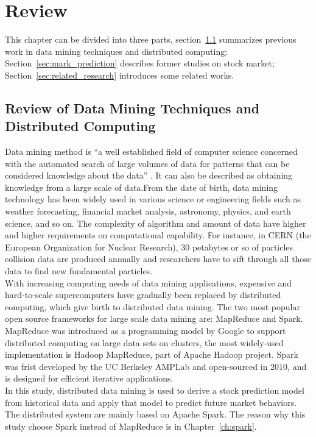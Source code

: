 \chapter{Review}
\label{ch:review}

This chapter can be divided into three parts, section~\ref{sec:dm_dc} summarizes previous work in data mining techniques and distributed computing; Section~\ref{sec:mark_prediction} describes former studies on stock market; Section~\ref{sec:related_research} introduces some related works.

\section{Review of Data Mining Techniques and Distributed Computing}
\label{sec:dm_dc}
Data mining method is ``a well established field of computer science concerned with the automated search of large volumes of data for patterns that can be considered knowledge about the data'' \cite{dubitzky2008data}. It can also be described as obtaining knowledge from a large scale of data.From the date of birth, data mining technology has been widely used in various science or engineering fields such as weather forecasting, financial market analysis, astronomy, physics, and earth science, and so on. The complexity of algorithm and amount of data have higher and higher requirements on computational capability. For instance, in CERN (the European Organization for Nuclear Research), 30 petabytes or so of particles collision data are produced annually and researchers have to sift through all those data to find new fundamental particles.\cite{O'Luanaigh:1997391}\\ 


With increasing computing needs of data mining applications, expensive and hard-to-scale supercomputers have gradually been replaced by distributed computing, which give birth to distributed data mining. The two most popular open source frameworks for large scale data mining are: MapReduce and Spark. MapReduce was introduced as a programming model by Google to support distributed computing on large data sets on clusters, the most widely-used implementation is Hadoop MapReduce, part of Apache Hadoop project\cite[Chapter~3]{sammer2012hadoop}. Spark was frist developed by the UC Berkeley AMPLab and open-sourced in 2010, and is designed for efficient iterative applications\cite{meng2016mllib}.\\

In this study, distributed data mining is used to derive a stock prediction model from historical data and apply that model to predict future market behaviors. The distributed system are mainly based on Apache Spark. The reason why this study choose Spark instead of MapReduce is in Chapter~\ref{ch:spark}.\\
 

